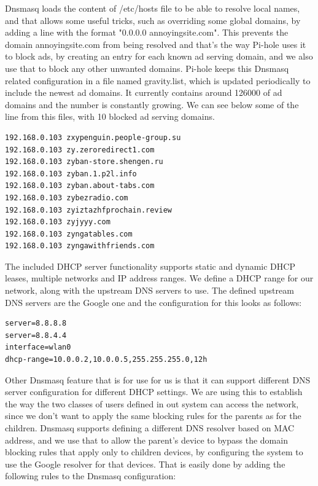 Dnsmasq loads the content of /etc/hosts file to be able to resolve local names, and that allows some useful tricks, such as overriding some global domains, by adding a line with the format "0.0.0.0 annoyingsite.com". This prevents the domain annoyingsite.com from being resolved and that's the way Pi-hole uses it to block ads, by creating an entry for each known ad serving domain, and we also use that to block any other unwanted domains. Pi-hole keeps this Dnsmasq related configuration in a file named gravity.list, which is updated periodically to include the newest ad domains. It currently contains around 126000 of ad domains and the number is constantly growing. We can see below some of the line from this files, with 10 blocked ad serving domains.

\begin{lstlisting}
192.168.0.103 zxypenguin.people-group.su
192.168.0.103 zy.zeroredirect1.com
192.168.0.103 zyban-store.shengen.ru
192.168.0.103 zyban.1.p2l.info
192.168.0.103 zyban.about-tabs.com
192.168.0.103 zybezradio.com
192.168.0.103 zyiztazhfprochain.review
192.168.0.103 zyjyyy.com
192.168.0.103 zyngatables.com
192.168.0.103 zyngawithfriends.com
\end{lstlisting}

The included DHCP server functionality supports static and dynamic DHCP leases, multiple networks and IP address ranges. We define a DHCP range for our network, along with the upstream DNS servers to use. The defined upstream DNS servers are the Google one and the configuration for this looks as follows:

\begin{lstlisting}
server=8.8.8.8
server=8.8.4.4
interface=wlan0
dhcp-range=10.0.0.2,10.0.0.5,255.255.255.0,12h
\end{lstlisting}

Other Dnsmasq feature that is for use for us is that it can support different DNS server configuration for different DHCP settings. We are using this to establish the way the two classes of users defined in out system can access the network, since we don't want to apply the same blocking rules for the parents as for the children. Dnsmasq supports defining a different DNS resolver based on MAC address, and we use that to allow the parent's device to bypass the domain blocking rules that apply only to children devices, by configuring the system to use the Google resolver for that devices. That is easily done by adding the following rules to the Dnsmasq configuration:


